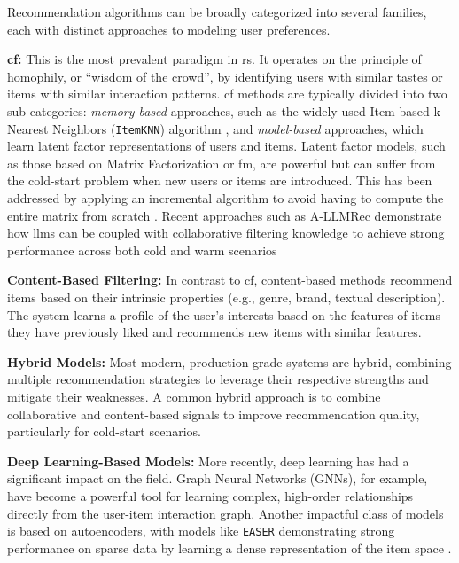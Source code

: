 Recommendation algorithms can be broadly categorized into several families, each with distinct approaches to modeling user preferences.

\begin{compactitem}[\textbullet]
    \item \textbf{\ac{cf}:} This is the most prevalent paradigm in \ac{rs}. It operates on the principle of homophily, or ``wisdom of the crowd'', by identifying users with similar tastes or items with similar interaction patterns. \ac{cf} methods are typically divided into two sub-categories: \textit{memory-based} approaches, such as the widely-used Item-based k-Nearest Neighbors (\texttt{ItemKNN}) algorithm \cite{ITEMKNN}, and \textit{model-based} approaches, which learn latent factor representations of users and items. Latent factor models, such as those based on Matrix Factorization or \ac{fm}, are powerful but can suffer from the cold-start problem when new users or items are introduced. This has been addressed by applying an incremental algorithm to avoid having to compute the entire matrix from scratch \cite{COLD-START-INCREMENTAL-FM}. Recent approaches such as A-LLMRec demonstrate how \acp{llm} can be coupled with collaborative filtering knowledge to achieve strong performance across both cold and warm scenarios \cite{SOTA-LLM-CF}

    \item \textbf{Content-Based Filtering:} In contrast to \ac{cf}, content-based methods recommend items based on their intrinsic properties (e.g., genre, brand, textual description). The system learns a profile of the user's interests based on the features of items they have previously liked and recommends new items with similar features.

    \item \textbf{Hybrid Models:} Most modern, production-grade systems are hybrid, combining multiple recommendation strategies to leverage their respective strengths and mitigate their weaknesses. A common hybrid approach is to combine collaborative and content-based signals to improve recommendation quality, particularly for cold-start scenarios.

    \item \textbf{Deep Learning-Based Models:} More recently, deep learning has had a significant impact on the field. Graph Neural Networks (GNNs), for example, have become a powerful tool for learning complex, high-order relationships directly from the user-item interaction graph. Another impactful class of models is based on autoencoders, with models like \texttt{EASER} demonstrating strong performance on sparse data by learning a dense representation of the item space \cite{EASER}.
\end{compactitem}